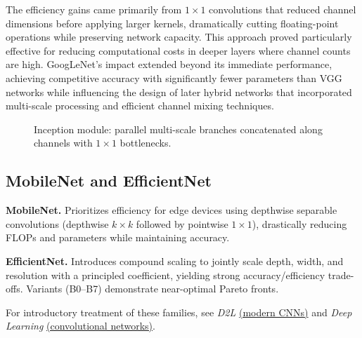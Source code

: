 The efficiency gains came primarily from $1\times1$ convolutions that reduced channel dimensions before applying larger kernels, dramatically cutting floating-point operations while preserving network capacity. This approach proved particularly effective for reducing computational costs in deeper layers where channel counts are high. GoogLeNet's impact extended beyond its immediate performance, achieving competitive accuracy with significantly fewer parameters than VGG networks while influencing the design of later hybrid networks that incorporated multi-scale processing and efficient channel mixing techniques.

\begin{figure}[h]
    \centering
    \caption{Inception module: parallel multi-scale branches concatenated along channels with $1\times1$ bottlenecks.}
    \label{fig:inception-module}
\end{figure}

\subsection{MobileNet and EfficientNet}

\textbf{MobileNet.} Prioritizes efficiency for edge devices using depthwise separable convolutions (depthwise $k\times k$ followed by pointwise $1\times1$), drastically reducing FLOPs and parameters while maintaining accuracy.

\textbf{EfficientNet.} Introduces compound scaling to jointly scale depth, width, and resolution with a principled coefficient, yielding strong accuracy/efficiency trade-offs. Variants (B0--B7) demonstrate near-optimal Pareto fronts.

For introductory treatment of these families, see \textit{D2L} \href{https://d2l.ai/chapter_convolutional-modern/index.html}{(modern CNNs)} and \textit{Deep Learning} \href{https://www.deeplearningbook.org/contents/convnets.html}{(convolutional networks)}.


